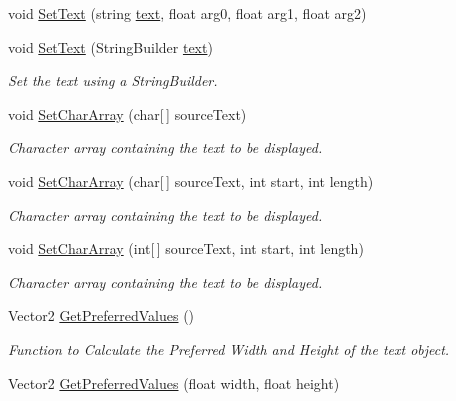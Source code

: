 \begin{DoxyCompactItemize}
\item 
void \mbox{\hyperlink{class_t_m_pro_1_1_t_m_p___text_a5b24897f4f2252899c7f09238facc745}{Set\+Text}} (string \mbox{\hyperlink{class_t_m_pro_1_1_t_m_p___text_a98a04e5078612c0586472bd510f91f5c}{text}}, float arg0, float arg1, float arg2)
\item 
void \mbox{\hyperlink{class_t_m_pro_1_1_t_m_p___text_a1dcc7f267313604b2f59cb5f2e46d7e8}{Set\+Text}} (String\+Builder \mbox{\hyperlink{class_t_m_pro_1_1_t_m_p___text_a98a04e5078612c0586472bd510f91f5c}{text}})
\begin{DoxyCompactList}\small\item\em Set the text using a String\+Builder. \end{DoxyCompactList}\item 
void \mbox{\hyperlink{class_t_m_pro_1_1_t_m_p___text_a3a9c8337c13ec0b01a256657b60f995d}{Set\+Char\+Array}} (char\mbox{[}$\,$\mbox{]} source\+Text)
\begin{DoxyCompactList}\small\item\em Character array containing the text to be displayed. \end{DoxyCompactList}\item 
void \mbox{\hyperlink{class_t_m_pro_1_1_t_m_p___text_ab92527193dad910ee30c957c5dcd7a16}{Set\+Char\+Array}} (char\mbox{[}$\,$\mbox{]} source\+Text, int start, int length)
\begin{DoxyCompactList}\small\item\em Character array containing the text to be displayed. \end{DoxyCompactList}\item 
void \mbox{\hyperlink{class_t_m_pro_1_1_t_m_p___text_a8938561d5a974e863b79446672b13cd9}{Set\+Char\+Array}} (int\mbox{[}$\,$\mbox{]} source\+Text, int start, int length)
\begin{DoxyCompactList}\small\item\em Character array containing the text to be displayed. \end{DoxyCompactList}\item 
Vector2 \mbox{\hyperlink{class_t_m_pro_1_1_t_m_p___text_a9d3dbcb6ccf3ef97454b5ec89725eccb}{Get\+Preferred\+Values}} ()
\begin{DoxyCompactList}\small\item\em Function to Calculate the Preferred Width and Height of the text object. \end{DoxyCompactList}\item 
Vector2 \mbox{\hyperlink{class_t_m_pro_1_1_t_m_p___text_a214f876e2c3bbcfde711d95e4c79b821}{Get\+Preferred\+Values}} (float width, float height)

\end{DoxyCompactItemize}
